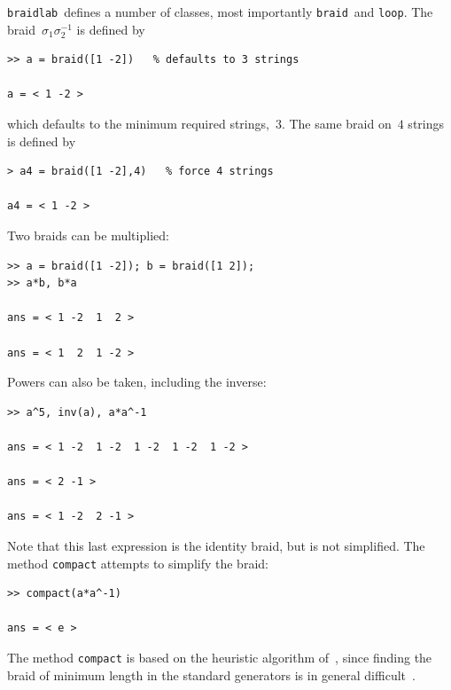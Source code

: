 \documentclass[12pt]{article}
\newcommand{\braidlab}{\texttt{braidlab}}%
\newcommand{\braid}{\texttt{braid}}%
\newcommand{\loopc}{\texttt{loop}}%
\begin{document}
\braidlab\ defines a number of classes, most importantly \braid\ and
\loopc.  The braid~$\sigma_1\sigma_2^{-1}$ is defined by
\begin{lstlisting}[frame=single,framerule=0pt]
>> a = braid([1 -2])   % defaults to 3 strings

a = < 1 -2 >
\end{lstlisting}
which defaults to the minimum required strings,~$3$.  The same braid
on~$4$ strings is defined by
\begin{lstlisting}[frame=single,framerule=0pt]
> a4 = braid([1 -2],4)   % force 4 strings

a4 = < 1 -2 >
\end{lstlisting}
Two braids can be multiplied:
\begin{lstlisting}[frame=single,framerule=0pt]
>> a = braid([1 -2]); b = braid([1 2]);
>> a*b, b*a

ans = < 1 -2  1  2 >

ans = < 1  2  1 -2 >
\end{lstlisting}
Powers can also be taken, including the inverse:
\begin{lstlisting}[frame=single,framerule=0pt]
>> a^5, inv(a), a*a^-1

ans = < 1 -2  1 -2  1 -2  1 -2  1 -2 >

ans = < 2 -1 >

ans = < 1 -2  2 -1 >
\end{lstlisting}
Note that this last expression is the identity braid, but is not
simplified.  The method \lstinline{compact} attempts to simplify the
braid:
\begin{lstlisting}[frame=single,framerule=0pt]
>> compact(a*a^-1)

ans = < e >
\end{lstlisting}
The method \lstinline{compact} is based on the heuristic algorithm
of~\citet{Bangert2002}, since finding the braid of minimum length in
the standard generators is in general difficult~\citep{Paterson1991}.
\end{document}
